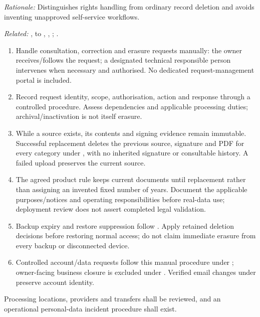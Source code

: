 \textit{Rationale:} Distinguishes rights handling from ordinary record deletion and avoids inventing unapproved self-service workflows.

\textit{Related:} \hyperref[fr:003]{}, \hyperref[fr:021]{} to \hyperref[fr:023]{}, \hyperref[fr:038]{}, \hyperref[fr:041]{}; \hyperref[br:026]{}.
\begin{enumerate}[label=(\alph*),leftmargin=*,itemsep=1pt,topsep=3pt]
\item Handle consultation, correction and erasure requests manually: the owner receives/follows the request; a designated technical responsible person intervenes when necessary and authorised. No dedicated request-management portal is included.
\item Record request identity, scope, authorisation, action and response through a controlled procedure. Assess dependencies and applicable processing duties; archival/inactivation is not itself erasure.
\item While a source exists, its contents and signing evidence remain immutable. Successful replacement deletes the previous source, signature and PDF for every category under , with no inherited signature or consultable history. A failed upload preserves the current source.
\item The agreed product rule keeps current documents until replacement rather than assigning an invented fixed number of years. Document the applicable purposes/notices and operating responsibilities before real-data use; deployment review does not assert completed legal validation.
\item Backup expiry and restore suppression follow . Apply retained deletion decisions before restoring normal access; do not claim immediate erasure from every backup or disconnected device.
\item Controlled account/data requests follow this manual procedure under ; owner-facing business closure is excluded under . Verified email changes under  preserve account identity.
\end{enumerate}

\label{nfr:PRV-05}
Processing locations, providers and transfers shall be reviewed, and an operational personal-data incident procedure shall exist.

